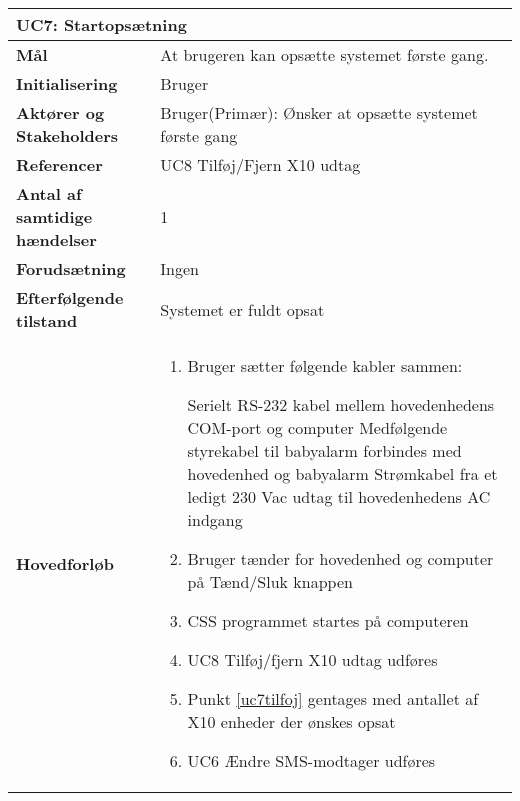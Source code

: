 \begin{table}[H] \centering
	\begin{tabular}{|p{6cm}|p{8cm}|}
	\hline
		\multicolumn{2}{|l|}{\textbf{UC7: Startopsætning}} \\\hline
		
		\textbf{Mål}							&At brugeren kan opsætte systemet første gang.					\\\hline
		\textbf{Initialisering}				&Bruger					 										\\\hline
		\textbf{Aktører og Stakeholders}		&Bruger(Primær): Ønsker at opsætte systemet første gang			\\\hline
		\textbf{Referencer}					&UC8 Tilføj/Fjern X10 udtag										\\\hline
		\textbf{Antal af samtidige hændelser}&1 																\\\hline
		\textbf{Forudsætning}				&Ingen															\\\hline
		\textbf{Efterfølgende tilstand}		&Systemet er fuldt opsat											\\\hline
		\textbf{Hovedforløb}					
			&\begin{enumerate}
	
				\item Bruger sætter følgende kabler sammen:
				
					\subitem Serielt RS-232 kabel mellem hovedenhedens COM-port og computer
					\subitem Medfølgende styrekabel til babyalarm forbindes med hovedenhed og babyalarm
					\subitem Strømkabel fra et ledigt 230 Vac udtag til hovedenhedens AC indgang
				
				\item Bruger tænder for hovedenhed og computer på Tænd/Sluk knappen
				
				\item CSS programmet startes på computeren
				
				\item \label{uc7tilfoj} UC8 Tilføj/fjern X10 udtag udføres
				
				\item Punkt \ref{uc7tilfoj} gentages med antallet af X10 enheder der ønskes opsat
				
				\item \lavel{uc7sms} UC6 Ændre SMS-modtager udføres
																													
			\end{enumerate}\\\hline
											
	\end{tabular}
	\label{UC7} 
\end{table}